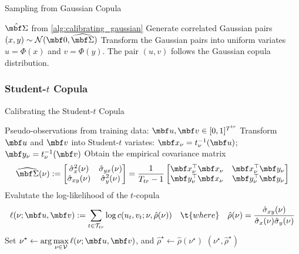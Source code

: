 \documentclass[12pt,a4paper]{article}
\begin{document}
\begin{algorithm}[H]
\label{alg:sampling_gaussian}
\caption{Sampling from Gaussian Copula}
\begin{algorithmic}[1]
\Require $\hat{\mbf \Sigma}$ from \cref{alg:calibrating_gaussian}
\State Generate correlated Gaussian pairs $(x,y)\sim\mathcal N(\mbf 0, \widehat{\mbf \Sigma})$
\State Transform the Gaussian pairs into uniform variates %
$u = \Phi(x)$ and $v = \Phi(y)$.
\Ensure The pair $(u,v)$  follows the Gaussian copula distribution.
\end{algorithmic}
\end{algorithm}


\subsubsection{Student-$t$ Copula}

\begin{algorithm}[H]
\label{alg:calibrating_student-t}
\caption{Calibrating the Student-$t$ Copula}
\begin{algorithmic}[1]
\Require Pseudo-observations from training data: $\mbf u,\mbf v\in [0,1]^{T^{tr}}$
	\State Transform $\mbf u$ and $\mbf v$ into Student-$t$ variates: %
$\mbf x_{\nu}=t_{\nu}^{-1}(\mbf u)$;~~$\mbf y_{\nu}=t_{\nu}^{-1}(\mbf v)$
	\State Obtain the empirical covariance matrix 
		$$
		\widehat{\mbf \Sigma}(\nu)
		:=
		\begin{bmatrix} 
			\hat \sigma_{x}^2(\nu) & \hat \sigma_{yx}(\nu) \\
			\hat \sigma_{xy}(\nu) & \hat \sigma_{y}^2(\nu)
		\end{bmatrix}
		= 
		\frac{1}{T_{tr}-1}
		\begin{bmatrix} 
			\mbf x_{\nu}^\top\mbf x_{\nu} & \mbf x_{\nu}^\top\mbf y_{\nu} \\ 
			\mbf y_{\nu}^\top\mbf x_{\nu} & \mbf y_{\nu}^\top\mbf y_{\nu} 
		\end{bmatrix}
		$$
	\State Evalutate the log-likelihood of the $t$-copula
$$
\ell(\nu; \mbf u, \mbf v):= 
\sum_{t\in\mathcal T_{tr}}  \log c(u_t, v_t; \nu, \hat \rho(\nu))
\quad 
\t{where}
\quad 
\hat \rho(\nu) = \frac{\hat \sigma_{xy}(\nu)}{\hat \sigma_x(\nu) \hat \sigma_y(\nu)}
$$
\EndFor
\State Set 
	$\displaystyle \nu^{\star} \gets \arg\max_{\nu \in \mathcal V} \ell(\nu; \mbf u, \mbf v)$, and
	$\displaystyle \hat \rho^\star \gets  \hat \rho (\nu^\star)$
	\Ensure $(\nu^\star, \hat \rho^\star)$
\end{algorithmic}
\end{algorithm}
\end{document}
